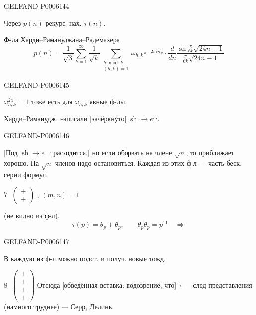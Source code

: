 \begin{GelfandAdjacentEvidence}{GELFAND-P000614}{4}

Через \(p(n)\) рекурс. нах. \(\tau(n)\).

Ф-ла Харди–Рамануджана–Радемахера
\[
p(n)=\frac1{\sqrt3}\sum_{k=1}^{\infty}\frac1{\sqrt k}
\sum_{\substack{h\bmod k\\(h,k)=1}}
\omega_{h,k}e^{-2\pi i n\frac1k}\cdot
\frac d{dn}\frac{\operatorname{sh}\frac\pi{6k}\sqrt{24n-1}}
{\frac\pi{6k}\sqrt{24n-1}}
\]
\end{GelfandAdjacentEvidence}
\begin{GelfandAdjacentEvidence}{GELFAND-P000614}{5}

\(\omega_{h,k}^{24}=1\) тоже есть для \(\omega_{h,k}\) явные ф-лы.

Харди–Раманудж. написали [зачёркнуто] \(\operatorname{sh}\to e^{\ldots}\).
\end{GelfandAdjacentEvidence}
\begin{GelfandAdjacentEvidence}{GELFAND-P000614}{6}

[Под \(\operatorname{sh}\to e^{\ldots}\): расходится.]
но если оборвать на члене \(\sqrt n\), то приближает хорошо.
На \(\sqrt n\) членов надо остановиться.
Каждая из этих ф-л — часть беск. серии формул.

\textcircled{\scriptsize 7}\quad
\(\left(\begin{smallmatrix}+\\+\end{smallmatrix}\right)\)
\qquad {}, \((m,n)=1\)

(не видно из ф-л).
\[
\tau(p)=\theta_p+\bar\theta_p,\qquad\theta_p\bar\theta_p=p^{11}
\quad\Rightarrow
\]
\begin{center}
\end{center}
\end{GelfandAdjacentEvidence}
\begin{GelfandAdjacentEvidence}{GELFAND-P000614}{7}

В каждую из ф-л можно подст. и получ. новые тожд.

\textcircled{\scriptsize 8}\quad
\(\left(\begin{smallmatrix}+\\+\\+\\+\end{smallmatrix}\right)\)
\qquad Отсюда [обведённая вставка: подозрение, что] \(\tau\) — след представления (намного труднее) — Серр, Делинь.
\end{GelfandAdjacentEvidence}
